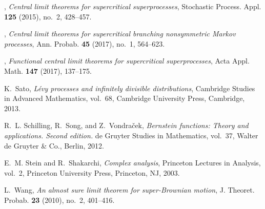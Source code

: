 \documentclass[12pt,a4paper]{amsart}
\theoremstyle{plain}
\theoremstyle{definition}
\numberwithin{equation}{section}
\begin{document}
\begin{thebibliography}{10}
\bysame, \emph{Central limit theorems for supercritical superprocesses},
  Stochastic Process. Appl. \textbf{125} (2015), no.~2, 428--457.

\bysame, \emph{Central limit theorems for supercritical branching nonsymmetric
  {M}arkov processes}, Ann. Probab. \textbf{45} (2017), no.~1, 564--623.

\bysame, \emph{Functional central limit theorems for supercritical
  superprocesses}, Acta Appl. Math. \textbf{147} (2017), 137--175.

K.~Sato, \emph{L{\'e}vy processes and infinitely divisible distributions},
  Cambridge Studies in Advanced Mathematics, vol.~68, Cambridge University
  Press, Cambridge, 2013.

R.~L. Schilling, R.~Song, and Z.~Vondra\v{c}ek, 
\emph{Bernstein functions: Theory and applications. Second edition.}
de  Gruyter Studies in Mathematics, vol.~37, Walter de Gruyter \& Co., Berlin,
  2012.

E.~M. Stein and R.~Shakarchi, \emph{Complex analysis}, Princeton Lectures in
  Analysis, vol.~2, Princeton University Press, Princeton, NJ, 2003.

L.~Wang, \emph{An almost sure limit theorem for super-{B}rownian motion}, J.
  Theoret. Probab. \textbf{23} (2010), no.~2, 401--416.


\end{thebibliography}
\end{document}
